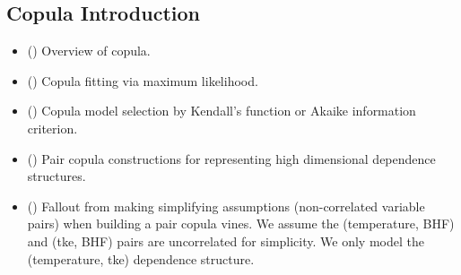 \subsection{Copula Introduction}

\begin{itemize}
    \item (\checkmark) Overview of copula.
    \item (\checkmark) Copula fitting via maximum likelihood.
    \item (\checkmark) Copula model selection by Kendall's function or Akaike information criterion.
    \item (\cdot) Pair copula constructions for representing high dimensional dependence structures.
    \item (\cdot) Fallout from making simplifying assumptions (non-correlated variable pairs) when building
          a pair copula vines.  We assume the (temperature, BHF) and (tke, BHF) pairs are uncorrelated for simplicity.
          We only model the (temperature, tke) dependence structure.
\end{itemize}
